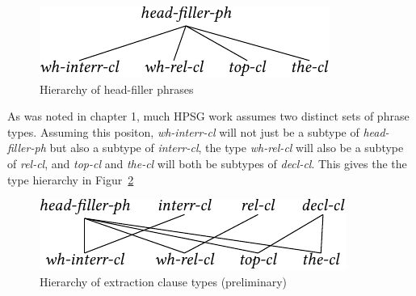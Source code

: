 \documentclass[output=paper
                ,modfonts
                ,nonflat
	        ,collection
	        ,collectionchapter
	        ,collectiontoclongg
 	        ,biblatex
                ,babelshorthands
                ,newtxmath
                ,draftmode
                ,colorlinks, citecolor=brown
]{./langsci/langscibook}
\begin{document}
{\begin{figure}[htb]
  \includegraphics{figures/BB-head-fill-hier-crop}
  \caption{\label{fig:UDC:48}Hierarchy of head-filler phrases}
  
\end{figure}


As was noted in chapter 1, much HPSG work assumes two distinct sets of
phrase types. Assuming this positon, \emph{wh-interr-cl} will not just
be a subtype of \emph{head-filler-ph} but also a subtype of
\emph{interr-cl}, the type \emph{wh-rel-cl} will also be a subtype of
\emph{rel-cl}, and \emph{top-cl} and \emph{the-cl} will both be subtypes
of \emph{decl-cl}. This gives the the type hierarchy in Figur~\ref{fig:UDC:49}

\begin{figure}[htb]
  \centering

  \includegraphics{figures/BB-extraction-function-hier-crop}
  \caption{\label{fig:UDC:49}Hierarchy of extraction clause types (preliminary)}
  
\end{figure}


}
\end{document}
